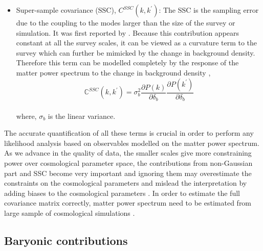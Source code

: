 \documentclass[
  11pt,
  twoside,
  openright,
  titlepage,
  headings=optiontoheadandtoc
]{scrbook}
\begin{document}
\begin{itemize}
	\item Super-sample covariance (SSC), $C^{SSC}(k,k^{\prime})$: The SSC is the sampling
			error due to the coupling to the modes larger than the size of the survey or
			simulation. It was first reported by \cite{2006MNRAS.371.1188H}.
			Because this contribution appears constant at all the survey scales, it 
			can be viewed as a curvature term to the survey which can further be mimicked 
			by the change in background density. Therefore this term can be modelled
			completely by the response of the matter power spectrum to the 
			change in background density \cite{2013PhRvD..87l3504T,2014PhRvD..90j3530L},
			\begin{equation}
				\mathbb{C}^{SSC}(k,k^{\prime}) = \sigma_b^2 \dfrac{\partial P(k)}{\partial \delta_b}
										\dfrac{\partial P(k^{\prime})}{\partial \delta_b}
			\end{equation}
			\\
			where, $\sigma_b$ is the linear variance. 
\end{itemize}

The accurate quantification of all these terms is crucial in order to perform any
likelihood analysis based on observables modelled on the matter power spectrum. As we
advance in the quality of data, the smaller scales give more constraining power 
over cosmological parameter space, the contributions from non-Gaussian part and SSC
become very important and ignoring them may overestimate the constraints on the 
cosmological parameters and mislead the interpretation by adding biases to the
cosmological parameters 
\cite{2000ApJ...537....1W,2007MNRAS.375L...6S,2008ApJ...686L...1L,2009MNRAS.395.2065T,2011MNRAS.416.1045K}.
In order to estimate the full covariance matrix correctly, matter power spectrum
need to be estimated from large sample of cosmological simulations
\cite{2013MNRAS.432.1928T,2009ApJ...700..479T,2015MNRAS.446.1756B}.


\subsection{Baryonic contributions}\label{sec:baryons}
\end{document}
